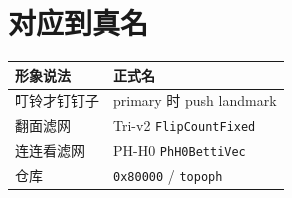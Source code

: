 \section{对应到真名}

\begin{center}
\begin{tabular}{@{}ll@{}}
\toprule
形象说法 & 正式名 \\
\midrule
叮铃才钉钉子 & primary 时 push landmark \\
翻面滤网 & Tri-v2 \texttt{FlipCountFixed} \\
连连看滤网 & PH-H0 \texttt{PhH0BettiVec} \\
仓库 & \texttt{0x80000} / \texttt{topoph} \\
\bottomrule
\end{tabular}
\end{center}
